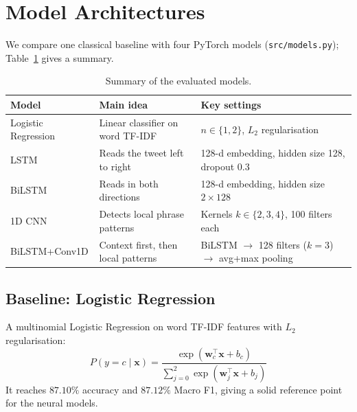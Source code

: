 \documentclass[11pt,a4paper]{article}
\begin{document}
\section{Model Architectures}

We compare one classical baseline with four PyTorch models (\texttt{src/models.py}); Table~\ref{tab:arch_summary} gives a summary.

\begin{table}[htbp]
\centering
\small
\begin{tabularx}{\textwidth}{@{}lXX@{}}
\toprule
\textbf{Model} & \textbf{Main idea} & \textbf{Key settings} \\
\midrule
Logistic Regression & Linear classifier on word TF-IDF & $n\in\{1,2\}$, $L_2$ regularisation \\
LSTM       & Reads the tweet left to right & 128-d embedding, hidden size 128, dropout 0.3 \\
BiLSTM     & Reads in both directions & 128-d embedding, hidden size $2\times128$ \\
1D CNN     & Detects local phrase patterns & Kernels $k\in\{2,3,4\}$, 100 filters each \\
BiLSTM+Conv1D & Context first, then local patterns & BiLSTM $\rightarrow$ 128 filters ($k=3$) $\rightarrow$ avg+max pooling \\
\bottomrule
\end{tabularx}
\caption{Summary of the evaluated models.}
\label{tab:arch_summary}
\end{table}

\subsection{Baseline: Logistic Regression}
A multinomial Logistic Regression on word TF-IDF features with $L_2$ regularisation:
\begin{equation}
    P(y = c \mid \mathbf{x}) = \frac{\exp(\mathbf{w}_c^\top \mathbf{x} + b_c)}{\sum_{j=0}^{2} \exp(\mathbf{w}_j^\top \mathbf{x} + b_j)}
\end{equation}
It reaches $87.10\%$ accuracy and $87.12\%$ Macro F1, giving a solid reference point for the neural models.
\end{document}
